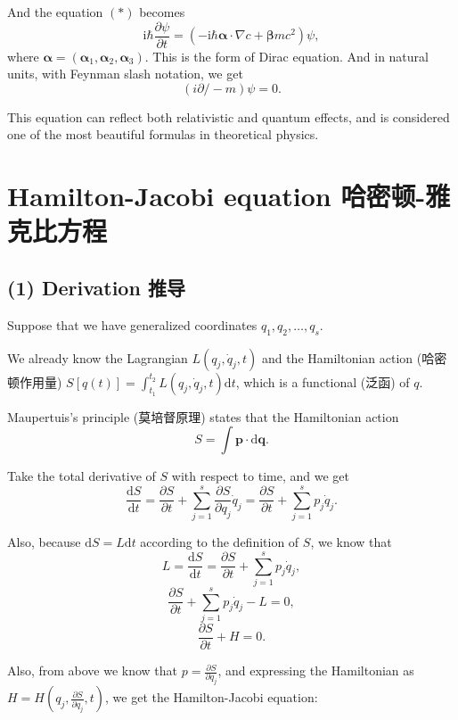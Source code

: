 And the equation \((*)\) becomes
\[\mathrm{i} \hbar \frac{\partial \psi}{\partial t} = \left( - \mathrm{i} \hbar \boldsymbol{\boldsymbol{\alpha}} \cdot \nabla c + \boldsymbol{\beta} mc^2 \right) \psi,\]
where
\(\boldsymbol{\alpha} = (\boldsymbol{\alpha}_1, \boldsymbol{\alpha}_2, \boldsymbol{\alpha}_3)\).
This is the form of Dirac equation. And in natural units, with Feynman
slash notation, we get \[(i\partial \!\!\!/ - m) \psi = 0.\]

This equation can reflect both relativistic and quantum effects, and is
considered one of the most beautiful formulas in theoretical physics.

\section{Hamilton-Jacobi equation
哈密顿-雅克比方程}\label{hamilton-jacobi-equation-ux54c8ux5bc6ux987f-ux96c5ux514bux6bd4ux65b9ux7a0b}

\subsection*{(1) Derivation 推导}\label{derivation-ux63a8ux5bfc-2}

Suppose that we have generalized coordinates \(q_1, q_2, \dots, q_s\).

We already know the Lagrangian \(L(q_j, \dot{q}_j, t)\) and the
Hamiltonian action (哈密顿作用量)
\(S[q(t)] = \int_{t_1}^{t_2} L(q_j, \dot{q}_j, t) \mathrm{d}t\), which
is a functional (泛函) of \(q\).

Maupertuis's principle (莫培督原理) states that the Hamiltonian action
\[S = \int \boldsymbol{p} \cdot \mathrm{d} \boldsymbol{q}.\]

Take the total derivative of \(S\) with respect to time, and we get
\[\frac{\mathrm{d}S}{\mathrm{d}t} = \frac{\partial S}{\partial t} + \sum_{j = 1}^{s} \frac{\partial S}{\partial q_j} \dot{q}_j = \frac{\partial S}{\partial t} + \sum_{j = 1}^{s} p_j \dot{q}_j.\]

Also, because \(\mathrm{d}S = L \mathrm{d}t\) according to the
definition of \(S\), we know that
\[L = \frac{\mathrm{d}S}{\mathrm{d}t} = \frac{\partial S}{\partial t} + \sum_{j = 1}^{s} p_j \dot{q}_j,\]
\[\frac{\partial S}{\partial t} + \sum_{j = 1}^{s} p_j \dot{q}_j - L = 0,\]
\[\frac{\partial S}{\partial t} + H = 0.\]

Also, from above we know that
\(\displaystyle p = \frac{\partial S}{\partial q_j}\), and expressing
the Hamiltonian as
\(\displaystyle H = H \left( q_j, \frac{\partial S}{\partial q_j}, t \right)\),
we get the Hamilton-Jacobi equation:

